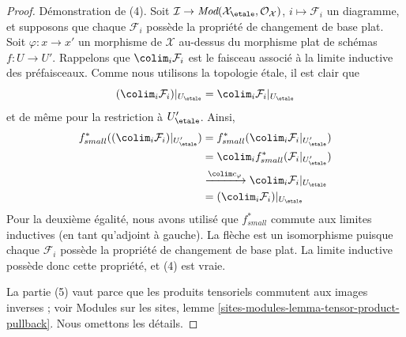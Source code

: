 \begin{proof}
\medskip\noindent
Démonstration de (4). Soit $\mathcal{I} \to
\textit{Mod}(\mathcal{X}_\etale, \mathcal{O}_\mathcal{X})$,
$i \mapsto \mathcal{F}_i$ un diagramme, et supposons que chaque $\mathcal{F}_i$
possède la propriété de changement de base plat. Soit $\varphi : x \to x'$ un morphisme
de $\mathcal{X}$ au-dessus du morphisme plat de schémas $f : U \to U'$.
Rappelons que $\colim_i \mathcal{F}_i$ est le faisceau associé à la limite inductive des préfaisceaux.
Comme nous utilisons la topologie étale, il est clair que
$$
(\colim_i \mathcal{F}_i)|_{U_\etale} =
\colim_i {\mathcal{F}_i}|_{U_\etale}
$$
et de même pour la restriction à $U'_\etale$. Ainsi,
\begin{align*}
f_{small}^*((\colim_i \mathcal{F}_i)|_{U'_\etale})
& =
f_{small}^*(\colim_i {\mathcal{F}_i}|_{U'_\etale}) \\
& =
\colim_i f_{small}^*({\mathcal{F}_i}|_{U'_\etale}) \\
& \xrightarrow{\colim c_\varphi}
\colim_i \mathcal{F}_i|_{U_\etale} \\
& =
(\colim_i \mathcal{F}_i)|_{U_\etale}
\end{align*}
Pour la deuxième égalité, nous avons utilisé que $f_{small}^*$ commute aux limites inductives
(en tant qu'adjoint à gauche). La flèche est un isomorphisme puisque chaque
$\mathcal{F}_i$ possède la propriété de changement de base plat. La limite inductive
possède donc cette propriété, et (4) est vraie.

\medskip\noindent
La partie (5) vaut parce que les produits tensoriels commutent aux images inverses ; voir
Modules sur les sites, lemme \ref{sites-modules-lemma-tensor-product-pullback}.
Nous omettons les détails.


\end{proof}
